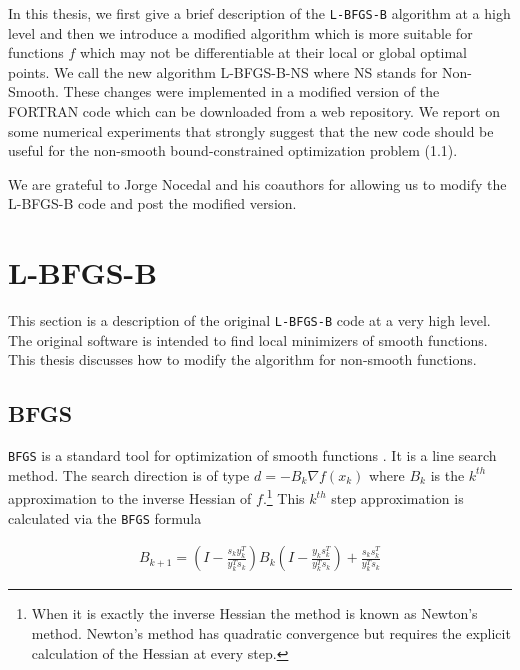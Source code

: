 In this thesis, we first give a brief description of the \texttt{L-BFGS-B} algorithm
at a high level and then we introduce a modified algorithm which
is more suitable for functions $f$ which may not be
differentiable at their local or global optimal points.  
We call the new algorithm L-BFGS-B-NS where NS stands for
Non-Smooth.  These changes were implemented in a modified version 
of the FORTRAN code \citep{lbfgsbNS} which can be downloaded from a web repository.  We report on some numerical experiments 
that strongly suggest that the new code should be useful for the
non-smooth bound-constrained optimization problem (1.1).

We are grateful to Jorge Nocedal and his coauthors for allowing us 
to modify the L-BFGS-B code and post the modified version.  

\chapter{L-BFGS-B}
\label{ChapterConstraints} %

This section is a description of the original \texttt{L-BFGS-B} code \citep{lbfgsbsoftware, codepaper} at a very high level. The original software is intended to find local minimizers of smooth functions. This thesis discusses how to modify the algorithm for non-smooth functions.

\section{BFGS}

\texttt{BFGS} is a standard tool for optimization of smooth functions \citep{nocedal}. It is a line search method. The search direction is of type $d = -B_k \nabla f(x_k)$ where $B_k$ is the $k^{th}$ approximation to the inverse Hessian of $f$.\footnote{When it is exactly the inverse Hessian the method is known as Newton's method. Newton's method has quadratic convergence but requires the explicit calculation of the Hessian at every step.} This $k^{th}$ step approximation is calculated via the \texttt{BFGS} formula

\begin{equation} \label{bfgsupdate}
  \begin{aligned}
    B_{k+1} = \left(I - \frac{s_ky_k^T}{y_k^Ts_k} \right) B_k \left( I - \frac{y_ks_k^T}{y_k^Ts_k} \right) + \frac{s_k s_k^T}{y_k^T s_k}
  \end{aligned}
\end{equation}

